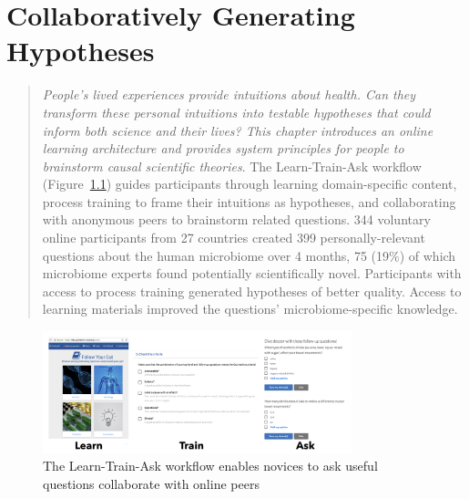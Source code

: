 \chapter{Collaboratively Generating Hypotheses}
\begin{quote}
\emph{People’s lived experiences provide intuitions about health.
Can they transform these personal intuitions into testable hypotheses
that could inform both science and their lives? This
chapter introduces an online learning architecture and provides
system principles for people to brainstorm causal scientific
theories}. The Learn-Train-Ask workflow (Figure~\ref{fig:docent-0}) 
guides participants through learning domain-specific content,
process training to frame their intuitions as hypotheses,
and collaborating with anonymous peers to brainstorm related
questions. 344 voluntary online participants from 27
countries created 399 personally-relevant questions about the
human microbiome over 4 months, 75 (19\%) of which microbiome
experts found potentially scientifically novel. Participants
with access to process training generated
hypotheses of better quality. Access to learning materials improved
the questions’ microbiome-specific knowledge.
\end{quote}

\begin{figure}[h] 
  \centering
  \includegraphics[width=0.8\textwidth]{figures/docent/fig-0.png}
  \caption[The Docent Learn-Train-Ask workflow]
{The Learn-Train-Ask workflow enables novices to ask useful questions collaborate with online peers}
  \label{fig:docent-0}
\end{figure}

\vspace{0.25in}


